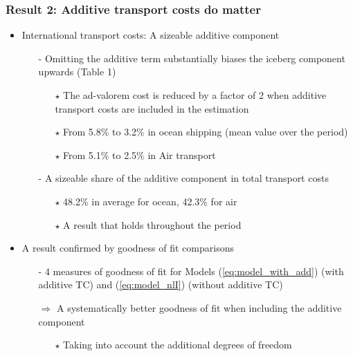 \documentclass[10 pt,Helvetica, french]{beamer}
\begin{document}
\begin{frame}[label=slide_result2]
\frametitle{Result 2: Additive transport costs do matter}
\begin{itemize}
\item International transport costs: A sizeable additive component \vspace{0.1cm}
\begin{itemize}
\item[-] Omitting the additive term substantially biases the iceberg component upwards (Table 1) \vspace{0.1cm}
\begin{itemize}
\item[$\star$] The ad-valorem cost is reduced by a factor of 2 when additive transport costs are included in the estimation  \vspace{0.1cm}
\item[$\star$] From 5.8\% to 3.2\% in ocean shipping (mean value over the period) \vspace{0.1cm}
\item[$\star$] From 5.1\% to 2.5\% in Air transport \vspace{0.1cm}
\end{itemize}
\item[-] A sizeable share of the additive component in total transport costs \vspace{0.1cm}
\begin{itemize}
\item[$\star$] 48.2\% in average for ocean, 42.3\% for air  \vspace{0.1cm}
\item[$\star$] A result that holds throughout the period \hyperlink{slide_fig1}{} \vspace{0.1cm}
\end{itemize}
\end{itemize}
\item A result confirmed by goodness of fit comparisons \vspace{0.1cm}
\begin{itemize}
\item[-] 4 measures of goodness of fit for Models (\ref{eq:model_with_add}) (with additive TC) and (\ref{eq:model_nlI}) (without additive TC) \vspace{0.1cm}
\item[$\Rightarrow$] A systematically better goodness of fit when including the additive component \hyperlink{app_goodnessfit}{} \vspace{0.1cm}
\begin{itemize}
\item[$\star$] Taking into account the additional degrees of freedom
\end{itemize}
\end{itemize}
\end{itemize}
\end{frame}
\end{document}
